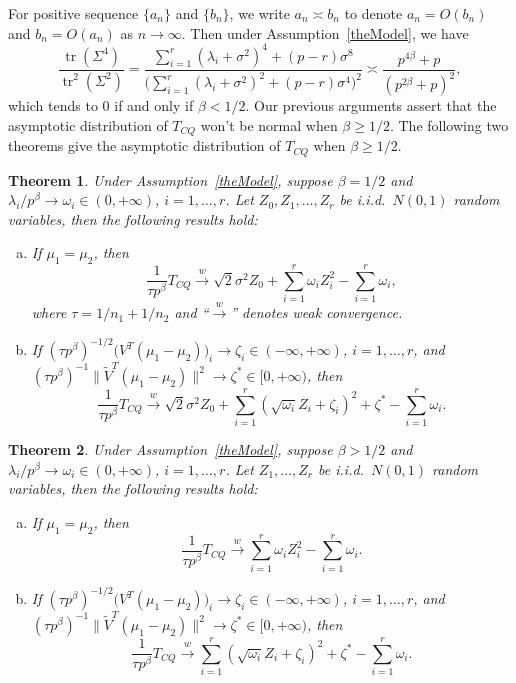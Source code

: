 \documentclass[review]{elsarticle}
\DeclareMathOperator{\mytr}{tr}
\theoremstyle{plain}
\newtheorem{theorem}{\quad\quad Theorem}
\theoremstyle{definition}
\theoremstyle{remark}
\begin{document}
For positive sequence $\{a_n\}$ and $\{b_n\}$, we write $a_n\asymp b_n$ to denote $a_n=O(b_n)$ and $b_n=O(a_n)$ as $n\to \infty$.
Then under Assumption~\ref{theModel}, we have
$$
\frac{\mytr(\Sigma^4)}{\mytr^2(\Sigma^2)}=\frac{\sum_{i=1}^r (\lambda_i+\sigma^2)^4+(p-r)\sigma^8}{\big(\sum_{i=1}^r (\lambda_i+\sigma^2)^2+(p-r)\sigma^4\big)^2}\asymp \frac{p^{4\beta}+p}{(p^{2\beta}+p)^2},
$$
 which tends to $0$ if and only if $\beta<1/2$.
Our previous arguments assert that the asymptotic distribution of $T_{CQ}$ won't be normal when $\beta\geq 1/2$.
The following two theorems give the asymptotic distribution of $T_{CQ}$ when $\beta\geq 1/2$.
\begin{theorem}\label{Chenstheory1}
 Under Assumption~\ref{theModel},
    suppose $\beta=1/2$ and $\lambda_i/p^\beta \to \omega_i\in(0,+\infty)$, $i=1,\ldots,r$.
    Let $Z_{0},Z_1,\ldots,Z_{r}$ be i.i.d.\ $N(0,1)$ random variables,
     then the following results hold:
     \begin{enumerate}[(a)]
         \item
             If $\mu_1=\mu_2$, then
    $$
        \frac{1}{\tau p^{\beta}} T_{CQ}
        \xrightarrow{w}
\sqrt{2}\sigma^2 Z_0
+
        \sum_{i=1}^r \omega_i Z_i^2
            -
        \sum_{i=1}^r \omega_i,
    $$
             where $\tau=1/n_1+1/n_2$ and ``$\xrightarrow{w}$'' denotes weak convergence.
         \item
             If $(\tau p^{\beta})^{-1/2}\big(V^T (\mu_1-\mu_2)\big)_i\to \zeta_i\in(-\infty,+\infty)$, $i=1,\ldots,r$,
             and
    ${(\tau p^\beta)}^{-1}\|\tilde{V}^T (\mu_1-\mu_2)\|^2\to \zeta^*\in [0,+\infty)$, then
    $$
        \frac{1}{\tau p^{\beta}} T_{CQ}
        \xrightarrow{w}
\sqrt{2}\sigma^2 Z_0+
        \sum_{i=1}^r (\sqrt{\omega_i} Z_i+\zeta_i)^2+
\zeta^*
        -
        \sum_{i=1}^r \omega_i.
    $$
     \end{enumerate}
\end{theorem}

\begin{theorem}\label{Chenstheory2}
 Under Assumption~\ref{theModel},
    suppose $\beta>1/2$ and $\lambda_i/p^\beta \to \omega_i\in(0,+\infty)$, $i=1,\ldots,r$.
    Let $Z_1,\ldots,Z_{r}$ be i.i.d.\ $N(0,1)$ random variables,
     then the following results hold:
     \begin{enumerate}[(a)]
         \item
             If $\mu_1=\mu_2$, then
    $$
        \frac{1}{\tau p^{\beta}} T_{CQ}
        \xrightarrow{w}
        \sum_{i=1}^r \omega_i Z_i^2
            -
        \sum_{i=1}^r \omega_i.
    $$
         \item
             If $(\tau p^{\beta})^{-1/2}\big(V^T (\mu_1-\mu_2)\big)_i\to \zeta_i\in(-\infty,+\infty)$, $i=1,\ldots,r$,
             and
    ${(\tau p^\beta)}^{-1}\|\tilde{V}^T (\mu_1-\mu_2)\|^2\to \zeta^*\in [0,+\infty)$, then
    $$
        \frac{1}{\tau p^{\beta}} T_{CQ}
        \xrightarrow{w}
        \sum_{i=1}^r (\sqrt{\omega_i} Z_i+\zeta_i)^2+
\zeta^*
        -
        \sum_{i=1}^r \omega_i.
    $$
     \end{enumerate}
\end{theorem}
\end{document}
